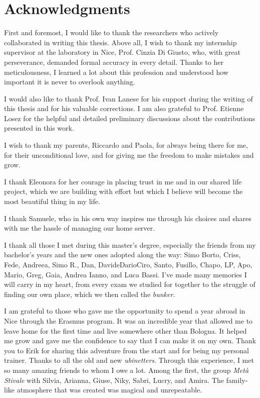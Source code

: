 \chapter*{Acknowledgments}

First and foremost, I would like to thank the researchers who actively 
collaborated in writing this thesis. Above all, I wish to thank my 
internship supervisor at the laboratory in Nice, Prof. Cinzia Di Giusto, 
who, with great perseverance, demanded formal accuracy in every detail. 
Thanks to her meticulousness, I learned a lot about this profession and 
understood how important it is never to overlook anything.

I would also like to thank Prof. Ivan Lanese for his support during the 
writing of this thesis and for his valuable corrections. I am also grateful 
to Prof. Etienne Losez for the helpful and detailed preliminary discussions 
about the contributions presented in this work.

I wish to thank my parents, Riccardo and Paola, for always being there for me, 
for their unconditional love, and for giving me the freedom to make mistakes 
and grow.

I thank Eleonora for her courage in placing trust in me and in our shared life 
project, which we are building with effort but which I believe will become 
the most beautiful thing in my life.

I thank Samuele, who in his own way inspires me through his choices and 
shares with me the hassle of managing our home server.

I thank all those I met during this master’s degree, especially the friends 
from my bachelor’s years and the new ones adopted along the way: Simo Borto, 
Criss, Fede, Andreea, Simo R., Dan, DavideDarioCiro, Santo, Fusillo, Chapo, 
LP, Apo, Mario, Greg, Gaia, Andrea Ianno, and Luca Bassi. I’ve made many 
memories I will carry in my heart, from every exam we studied for together 
to the struggle of finding our own place, which we then called the 
\emph{bunker}.

I am grateful to those who gave me the opportunity to spend a year abroad in 
Nice through the Erasmus program. It was an incredible year that allowed me 
to leave home for the first time and live somewhere other than Bologna. It 
helped me grow and gave me the confidence to say that I can make it on my own. 
Thank you to Erik for sharing this adventure from the start and for being my 
personal trainer. Thanks to all the old and new \emph{ubinetters}. Through 
this experience, I met so many amazing friends to whom I owe a lot. Among the 
first, the group \emph{Metà Stivale} with Silvia, Arianna, Giuse, Niky, 
Sabri, Lucry, and Amira. The family-like atmosphere that was created was 
magical and unrepeatable.

